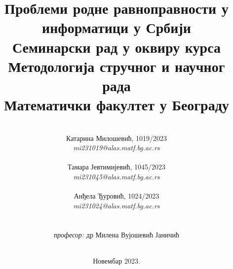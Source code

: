 \documentclass[a4paper]{article}
\begin{document}
\title{\textbf{Проблеми родне равноправности у информатици у Србији}\\
\vspace{10}
\small{Семинарски рад у оквиру курса\\Методологија стручног и научног рада\\ Математички факултет у Београду}}

\author{\\Катарина Милошевић, 1019/2023 \\ \textit{mi231019@alas.matf.bg.ac.rs} \\\\
        Тамара Јевтимијевић, 1045/2023 \\ \textit{mi231045@alas.matf.bg.ac.rs} \\\\
        Анђела Ђуровић, 1024/2023 \\ \textit{mi231024@alas.matf.bg.ac.rs} \\\\\\
        \textit{професор:} др Милена Вујошевић Јаничић \\\\}

\date{Новембар 2023.}

\maketitle
\thispagestyle{empty}


\renewcommand{\abstractname}{Сажетак}
\end{document}

